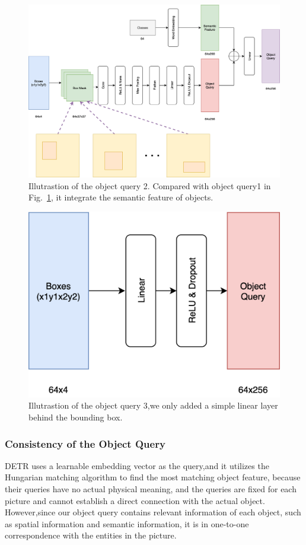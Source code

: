 \begin{figure}[tbph!]
	\centering
	\includegraphics[width=0.8\linewidth]{figures/obj_query1}
	\caption[Illutrastion of the object query 2]{Illutrastion of the object query 2. Compared with object query1 in Fig.~\ref{fig:objquery1}, it integrate the semantic feature of objects.}
	\label{fig:objquery1}
\end{figure}

\begin{figure}[tbph!]
	\centering
	\includegraphics[width=0.5\linewidth]{figures/obj_query2}
	\caption[Illutrastion of the object query 3]{Illutrastion of the object query 3,we only added a simple linear layer behind the bounding box.}
	\label{fig:objquery2}
\end{figure}

\subsubsection{Consistency of the Object Query }

DETR uses a learnable embedding vector as the query,and it utilizes the Hungarian matching algorithm to find the most matching object feature, because their queries have no actual physical meaning, and the queries are fixed for each picture and cannot establish a direct connection with the actual object.%
However,since our object query contains relevant information of each object, such as spatial information and semantic information, it is in one-to-one correspondence with the entities in the picture.

